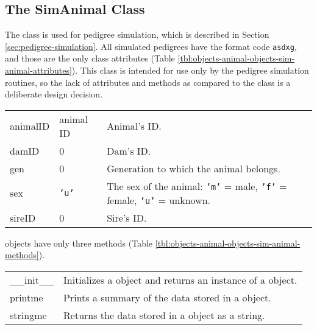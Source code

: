 \subsection{The SimAnimal Class}\label{sec:objects-animal-objects-sim-animal}
The  class is used for pedigree simulation, which is described in Section \ref{sec:pedigree-simulation}. All simulated pedigrees have the format code \texttt{asdxg}, and those are the only class attributes (Table \ref{tbl:objects-animal-objects-sim-animal-attributes}). This class is intended for use only by the pedigree simulation routines, so the lack of attributes and methods as compared to the  class is a deliberate design decision.
\begin{center}
    \tablelasttail{\hline}
    \label{tbl:objects-animal-objects-sim-animal-attributes}
    \begin{xtabular}{l|l|p{4in}}
        animalID & animal ID & Animal's ID. \\
        damID & 0 & Dam's ID. \\
        gen & 0 & Generation to which the animal belongs. \\
        sex & \texttt{'u'} & The sex of the animal: \texttt{'m'} = male, \texttt{'f'} = female, \texttt{'u'} = unknown. \\
        sireID & 0 & Sire's ID. \\
    \end{xtabular}
\end{center}
 objects have only three methods (Table \ref{tbl:objects-animal-objects-sim-animal-methods}).
\begin{center}
    \tablelasttail{\hline}
    \label{tbl:objects-animal-objects-sim-animal-methods}
    \begin{xtabular}{l|p{4in}}
        \_\_init\_\_ & Initializes a  object and returns an instance of a  object. \\
        printme & Prints a summary of the data stored in a  object. \\
        stringme & Returns the data stored in a  object as a string. \\
    \end{xtabular}
\end{center}
